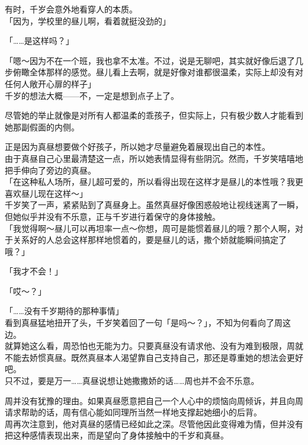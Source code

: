 有时，千岁会意外地看穿人的本质。\\

「因为，学校里的昼儿啊，看着就挺没劲的」

「……是这样吗？」

「嗯～因为不在一个班，我也拿不太准。不过，说是无聊吧，其实就好像后退了几步俯瞰全体那样的感觉。昼儿看上去啊，就是好像对谁都很温柔，实际上却没有对任何人敞开心扉的样子」\\

千岁的想法大概——不，一定是想到点子上了。

尽管她的举止就像是对所有人都温柔的乖孩子，但实际上，只有极少数人才能看到她那副假面的内侧。

正是因为真昼想要做个好孩子，所以她才尽量避免着展现出自己的本性。\\

由于真昼自己心里最清楚这一点，所以她表情显得有些阴沉。然而，千岁笑嘻嘻地把手伸向了旁边的真昼。\\

「在这种私人场所，昼儿超可爱的，所以看得出现在这样才是昼儿的本性哦？我更喜欢昼儿现在这样～」\\

千岁笑了一声，紧紧贴到了真昼身上。虽然真昼好像困惑般地让视线迷离了一瞬，但她似乎并没有不乐意，正与千岁进行着保守的身体接触。\\

「我觉得啊～昼儿可以再坦率一点～你想，周可是能惯着昼儿的哦？那个人啊，对于关系好的人总会这样那样地惯着的，要是昼儿的话，撒个娇就能瞬间搞定了哦？」

「我才不会！」

「哎～？」

「……没有千岁期待的那种事情」\\

看到真昼猛地扭开了头，千岁笑着回了一句「是吗～？」，不知为何看向了周这边。\\

就算她这么看，周恐怕也无能为力。只要真昼没有请求他、没有为难到极限，周就不能去娇惯真昼。既然真昼本人渴望靠自己支持自己，那还是尊重她的想法会更好吧。\\

只不过，要是万一……真昼说想让她撒撒娇的话……周也并不会不乐意。

周并没有犹豫的理由。如果真昼愿意把自己一个人心中的烦恼向周倾诉，并且向周请求帮助的话，周有信心能如同理所当然一样地支撑起她细小的后背。\\

周再次注意到，他对真昼的感情已经如此之深。尽管他因此变得难为情，但并没有把这种感情表现出来，而是望向了身体接触中的千岁和真昼。\\

